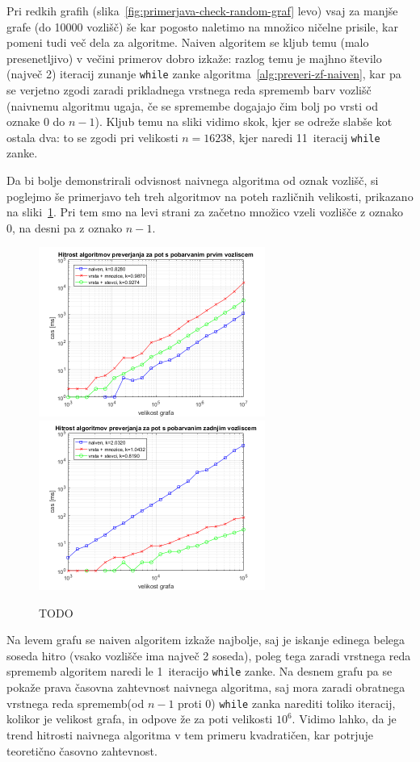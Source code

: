 \documentclass[12pt,a4paper,twoside]{article}
\theoremstyle{definition} %
\theoremstyle{plain} %
\numberwithin{equation}{section}  %
\begin{document}
Pri redkih grafih (slika~\ref{fig:primerjava-check-random-graf} levo) vsaj za manjše grafe (do 10000 vozlišč) še kar pogosto naletimo na množico ničelne prisile, kar pomeni tudi več dela za algoritme. Naiven algoritem se kljub temu (malo presenetljivo) v večini primerov dobro izkaže: razlog temu je majhno število (največ 2) iteracij zunanje \texttt{while} zanke algoritma~\ref{alg:preveri-zf-naiven}, kar pa se verjetno zgodi zaradi prikladnega vrstnega reda sprememb barv vozlišč (naivnemu algoritmu ugaja, če se spremembe dogajajo čim bolj po vrsti od oznake 0 do $n-1$). Kljub temu na sliki vidimo skok, kjer se odreže slabše kot ostala dva: to se zgodi pri velikosti $n=16238$, kjer naredi 11~iteracij \texttt{while} zanke. 

Da bi bolje demonstrirali odvisnost naivnega algoritma od oznak vozlišč, si poglejmo še primerjavo teh treh algoritmov na poteh različnih velikosti, prikazano na sliki~\ref{fig:primerjava-check-pot}. Pri tem smo na levi strani za začetno množico vzeli vozlišče z oznako 0, na desni pa z oznako $n-1$.
\begin{figure}[h]
    \centering
    \includegraphics[width=210pt]{koda/results/plots/pot_prvo_vozlisce.png}
    \includegraphics[width=210pt]{koda/results/plots/pot_zadnje_vozlisce.png}
    \caption{TODO}
    \label{fig:primerjava-check-pot}
\end{figure}
Na levem grafu se naiven algoritem izkaže najbolje, saj je iskanje edinega belega soseda hitro (vsako vozlišče ima največ 2 soseda), poleg tega zaradi vrstnega reda sprememb algoritem naredi le 1~iteracijo \texttt{while} zanke. Na desnem grafu pa se pokaže prava časovna zahtevnost naivnega algoritma, saj mora zaradi obratnega vrstnega reda sprememb(od $n-1$ proti 0) \texttt{while} zanka narediti toliko iteracij, kolikor je velikost grafa, in odpove že za poti velikosti $10^6$. Vidimo lahko, da je trend hitrosti naivnega algoritma v tem primeru kvadratičen, kar potrjuje teoretično časovno zahtevnost. 
\end{document}

